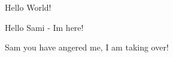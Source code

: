 \documentclass[10pt,a4paper]{article}
\begin{document}
Hello World!

Hello Sami - Im here!

Sam you have angered me, I am taking over! 
\end{document}

